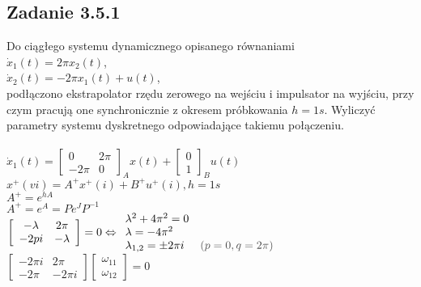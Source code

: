 \pagebreak
\subsection*{Zadanie 3.5.1} {\color{darkgray}
	Do ciągłego systemu dynamicznego opisanego równaniami\\
	$\dot{x}_1(t)=2\pi x_2(t)$,\\
	$\dot{x}_2(t)=-2 \pi x_1(t)+u(t)$,\\
	podłączono ekstrapolator rzędu zerowego na wejściu i impulsator na wyjściu, przy czym pracują one synchronicznie z okresem próbkowania $h = 1 s$. Wyliczyć parametry systemu dyskretnego odpowiadające takiemu połączeniu.
}\\\\
$\dot{x}_1(t)=\left[ \begin{array}{cc}     0&2\pi\\-2\pi&0    \end{array}\right]_Ax(t)+\left[ \begin{array}{c}     0\\1    \end{array}\right]_Bu(t)$\\
$x^+(vi)=A^+x^+(i)+B^+u^+(i), h=1s$\\
$A^+=e^{hA}$\\
$A^+=e^{A}=Pe^JP^{-1}$\\
$\left[ \begin{array}{cc}     -\lambda&2\pi\\-2pi&-\lambda    \end{array}\right]=0 \Leftrightarrow \begin{array}{l}\lambda^2+4\pi^2=0 \\ \lambda=-4\pi^2 \\ \lambda_{1,2}=\pm 2\pi i\end{array} \begin{array}{l} \\ \\{\color{darkgray} (p=0, q=2\pi)} \end{array}$\\
$\left[ \begin{array}{cc}     -2\pi i& \boxed{2\pi } \\-2\pi&-2\pi i    \end{array}\right]
\left[ \begin{array}{c}   \omega_{11}  \\ \omega_{12}   \end{array}\right] =0$\\
